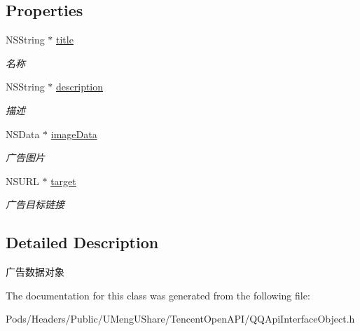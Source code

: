 \subsection*{Properties}
\begin{DoxyCompactItemize}
\item 
\mbox{\label{interface_q_q_api_ad_item_a1c21a5b5048ce1162042bc65c0e1dfc5}} 
N\+S\+String $\ast$ \mbox{\hyperlink{interface_q_q_api_ad_item_a1c21a5b5048ce1162042bc65c0e1dfc5}{title}}
\begin{DoxyCompactList}\small\item\em 名称 \end{DoxyCompactList}\item 
\mbox{\label{interface_q_q_api_ad_item_a0487f28318c0419b0fd36cd3f733b300}} 
N\+S\+String $\ast$ \mbox{\hyperlink{interface_q_q_api_ad_item_a0487f28318c0419b0fd36cd3f733b300}{description}}
\begin{DoxyCompactList}\small\item\em 描述 \end{DoxyCompactList}\item 
\mbox{\label{interface_q_q_api_ad_item_aed9d38cf5f737df137e26e505c93f92d}} 
N\+S\+Data $\ast$ \mbox{\hyperlink{interface_q_q_api_ad_item_aed9d38cf5f737df137e26e505c93f92d}{image\+Data}}
\begin{DoxyCompactList}\small\item\em 广告图片 \end{DoxyCompactList}\item 
\mbox{\label{interface_q_q_api_ad_item_a6b91c94bd29805a1f3aaba1881c15ba1}} 
N\+S\+U\+RL $\ast$ \mbox{\hyperlink{interface_q_q_api_ad_item_a6b91c94bd29805a1f3aaba1881c15ba1}{target}}
\begin{DoxyCompactList}\small\item\em 广告目标链接 \end{DoxyCompactList}\end{DoxyCompactItemize}


\subsection{Detailed Description}
广告数据对象 

The documentation for this class was generated from the following file\+:\begin{DoxyCompactItemize}
\item 
Pods/\+Headers/\+Public/\+U\+Meng\+U\+Share/\+Tencent\+Open\+A\+P\+I/Q\+Q\+Api\+Interface\+Object.\+h\end{DoxyCompactItemize}
